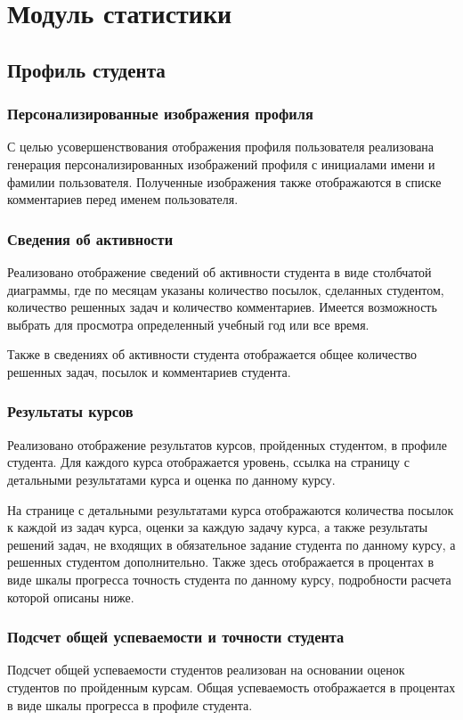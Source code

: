 \documentclass[12pt, a4paper, oneside]{article}
\begin{document}
\section{Модуль статистики}
\subsection{Профиль студента}
\subsubsection{Персонализированные изображения профиля}
С целью усовершенствования отображения профиля пользователя реализована генерация персонализированных изображений профиля с инициалами имени и фамилии пользователя. Полученные изображения также отображаются в списке комментариев перед именем пользователя.
\subsubsection{Сведения об активности}
Реализовано отображение сведений об активности студента в виде столбчатой диаграммы, где по месяцам указаны количество посылок, сделанных студентом, количество решенных задач и количество комментариев. Имеется возможность выбрать для просмотра определенный учебный год или все время.

Также в сведениях об активности студента отображается общее количество решенных задач, посылок и комментариев студента.
\subsubsection{Результаты курсов}
Реализовано отображение результатов курсов, пройденных студентом, в профиле студента. Для каждого курса отображается уровень, ссылка на страницу с детальными результатами курса и оценка по данному курсу.

На странице с детальными результатами курса отображаются количества посылок к каждой из задач курса, оценки за каждую задачу курса, а также результаты решений задач, не входящих в обязательное задание студента по данному курсу, а решенных студентом дополнительно. Также здесь отображается в процентах в виде шкалы прогресса точность студента по данному курсу, подробности расчета которой описаны ниже.
\subsubsection{Подсчет общей успеваемости и точности студента}
Подсчет общей успеваемости студентов реализован на основании оценок студентов по пройденным курсам. Общая успеваемость отображается в процентах в виде шкалы прогресса в профиле студента.
\end{document}
